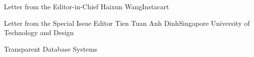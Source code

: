 \documentclass[11pt]{article}
\begin{document}


\begin{bulletin}


%
%

\begin{lettersection}


\begin{letter}{Letter from the Editor-in-Chief}
{Haixun Wang}{Instacart}

\end{letter}
%
\newpage
%
%
\begin{letter}{Letter from the Special Issue Editor} %
{Tien Tuan Anh Dinh}{Singapore University of Technology and Design}

\end{letter}

\end{lettersection}


\begin{articlesection}{Transparent Database Systems}
%
%


\end{articlesection}
\end{bulletin}
\end{document}
